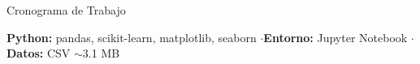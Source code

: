 \documentclass[aspectratio=169]{beamer}
\begin{document}
\begin{frame}{Cronograma de Trabajo}
\vspace{0.2cm}
\begin{tcolorbox}[colback=grisclaro, colframe=black!25, title=\footnotesize\textbf{Herramientas}]
\centering\footnotesize
\textbf{Python:} pandas, scikit-learn, matplotlib, seaborn
\quad$\cdot$\quad \textbf{Entorno:} Jupyter Notebook
\quad$\cdot$\quad \textbf{Datos:} CSV $\sim$3.1 MB
\end{tcolorbox}
\end{frame}
\end{document}
